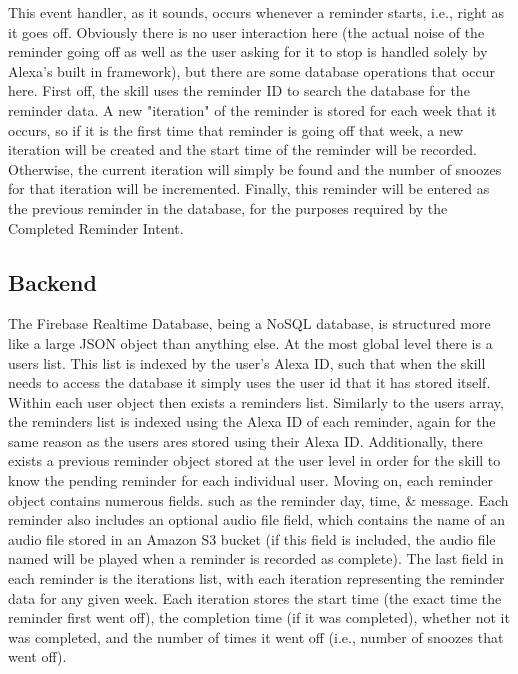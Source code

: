 \documentclass[conference]{IEEEtran}
\begin{document}
This event handler, as it sounds, occurs whenever a reminder starts, i.e., right as it goes off. 
Obviously there is no user interaction here (the actual noise of the reminder going off as well as the user asking for it to stop is handled solely by Alexa's built in framework), but there are some database operations that occur here. 
First off, the skill uses the reminder ID to search the database for the reminder data. 
A new "iteration" of the reminder is stored for each week that it occurs, so if it is the first time that reminder is going off that week, a new iteration will be created and the start time of the reminder will be recorded. 
Otherwise, the current iteration will simply be found and the number of snoozes for that iteration will be incremented. 
Finally, this reminder will be entered as the previous reminder in the database, for the purposes required by the Completed Reminder Intent. 

\subsection{Backend}

The Firebase Realtime Database, being a NoSQL database, is structured more like a large JSON object than anything else. 
At the most global level there is a users list. 
This list is indexed by the user's Alexa ID, such that when the skill needs to access the database it simply uses the user id that it has stored itself. 
Within each user object then exists a reminders list. 
Similarly to the users array, the reminders list is indexed using the Alexa ID of each reminder, again for the same reason as the users ares stored using their Alexa ID. 
Additionally, there exists a previous reminder object stored at the user level in order for the skill to know the pending reminder for each individual user. 
Moving on, each reminder object contains numerous fields. such as the reminder day, time, \& message. 
Each reminder also includes an optional audio file field, which contains the name of an audio file stored in an Amazon S3 bucket (if this field is included, the audio file named will be played when a reminder is recorded as complete).
The last field in each reminder is the iterations list, with each iteration representing the reminder data for any given week. 
Each iteration stores the start time (the exact time the reminder first went off), the completion time (if it was completed), whether not it was completed, and the number of times it went off (i.e., number of snoozes that went off). 
\end{document}
